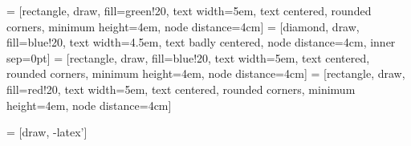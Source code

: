 
 = [rectangle, draw, fill=green!20, 
    text width=5em, text centered, rounded corners, minimum height=4em, node distance=4cm]
 = [diamond, draw, fill=blue!20, 
    text width=4.5em, text badly centered, node distance=4cm, inner sep=0pt]
 = [rectangle, draw, fill=blue!20, 
    text width=5em, text centered, rounded corners, minimum height=4em, node distance=4cm]
 = [rectangle, draw, fill=red!20, 
    text width=5em, text centered, rounded corners, minimum height=4em, node distance=4cm]


 = [draw, -latex']

    
